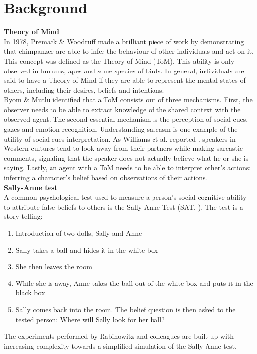 \documentclass[twocolumn,superscriptaddress,aps]{revtex4-1}
\begin{document}
\section{Background}\label{sec:background}

\noindent \textbf{Theory of Mind} \\[0.15cm]
In 1978, Premack \& Woodruff made a brilliant piece of work \cite{Woodruff} by demonstrating that chimpanzee are able to infer the behaviour of other individuals and act on it. This concept was defined as the Theory of Mind (ToM). This ability is only observed in humans, apes and some species of birds. In general, individuals are said to have a Theory of Mind if they are able to represent the mental states of others, including their desires, beliefs and intentions. \\

\indent Byom \& Mutlu \cite{Mutlu} identified that a ToM consists out of three mechanisms. First, the observer needs to be able to extract knowledge of the shared context with the observed agent. The second essential mechanism is the perception of social cues, gazes and emotion recognition. Understanding sarcasm is one example of the utility of social cues interpretation. As Williams et al. reported \cite{williams}, speakers in Western cultures tend to look away from their partners while making sarcastic comments, signaling that the speaker does not actually believe what he or she is saying. Lastly, an agent with a ToM needs to be able to interpret other's actions: inferring a character's belief based on observations of their actions.\\

\noindent \textbf{Sally-Anne test} \\[0.15cm]
A common psychological test used to measure a person's social cognitive ability to attribute false beliefs to others is the Sally-Anne Test (SAT, \cite{wimmer}). The test is a story-telling:
\begin{enumerate}
\item Introduction of two dolls, Sally and Anne
\item Sally takes a ball and hides it in the white box
\item She then leaves the room 
\item While she is away, Anne takes the ball out of the white box and puts it in the black box
\item Sally comes back into the room. The belief question is then asked to the tested person: Where will Sally look for her ball?
\end{enumerate}
The experiments performed by Rabinowitz and colleagues are built-up with increasing complexity towards a simplified simulation of the Sally-Anne test. \\
\end{document}
